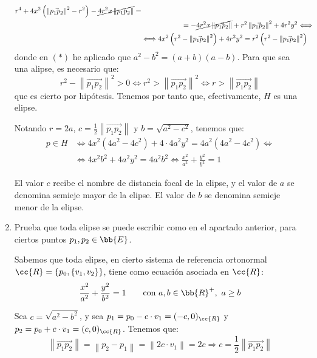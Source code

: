 \begin{ejercicio}
\begin{enumerate}
\begin{align*}
        r^4 + 4x^2\left(\left\|\vec{p_1p_2}\right\|^2-r^2\right) -\cancel{4r^2x\left\|\vec{p_1p_2}\right\|} =\\&\hspace{2cm}= - \cancel{4r^2x\left\|\vec{p_1p_2}\right\|} +r^2\left\|\vec{p_1p_2}\right\|^2 + 4r^2y^2 \Longleftrightarrow \\ & \Longleftrightarrow
        4x^2\left(r^2 - \left\|\vec{p_1p_2}\right\|^2\right) + 4r^2y^2 = r^2\left(r^2 - \left\|\vec{p_1p_2}\right\|^2\right)
    \end{align*}
    donde en $(\ast)$ he aplicado que $a^2-b^2=(a+b)(a-b)$. Para que sea una alipse, es necesario que:
    \begin{equation*}
        r^2 - \left\|\vec{p_1p_2}\right\|^2 > 0 \Longleftrightarrow
        r^2 > \left\|\vec{p_1p_2}\right\|^2 \Longleftrightarrow
        r > \left\|\vec{p_1p_2}\right\|
    \end{equation*}
    que es cierto por hipótesis. Tenemos por tanto que, efectivamente, $H$ es una elipse.
    
    Notando $r=2a$, $c=\frac{1}{2}\left\|\vec{p_1p_2}\right\|$ y $b=\sqrt{a^2-c^2}$, tenemos que:
    \begin{align*}
        p\in H &\Longleftrightarrow 4x^2\left(4a^2 - 4c^2\right) + 4\cdot 4a^2y^2 = 4a^2(4a^2 - 4c^2) \Longleftrightarrow \\ & \Longleftrightarrow
        4x^2b^2 + 4a^2y^2 = 4a^2b^2 \Longleftrightarrow
        \frac{x^2}{a^2} + \frac{y^2}{b^2} = 1
    \end{align*}

    El valor $c$ recibe el nombre de distancia focal de la elipse, y el valor de $a$ se denomina semieje mayor de la elipse.
    El valor de $b$ se denomina semieje menor de la elipse.

    \item Prueba que toda elipse se puede escribir como en el apartado anterior, para ciertos puntos $p_1, p_2 \in \bb{E}$.
    
    Sabemos que toda elipse, en cierto sistema de referencia ortonormal $\cc{R}=\{p_0, \{v_1, v_2\}\}$, tiene como ecuación asociada en $\cc{R}$:
    \begin{equation*}
        \frac{x^2}{a^2} + \frac{y^2}{b^2} = 1 \qquad \text{con } a,b\in \bb{R}^+,~a\geq b
    \end{equation*}

    Sea $c=\sqrt{a^2-b^2}$, y sea $p_1 = p_0 - c\cdot v_1=(-c,0)_{\cc{R}}$ y $p_2 = p_0  +c\cdot v_1=(c,0)_{\cc{R}}$. Tenemos que:
    \begin{equation*}
        \left\|\vec{p_1p_2}\right\| = \left\|p_2 - p_1\right\| = \left\|2c\cdot v_1\right\|= 2c \Longrightarrow c = \frac{1}{2}\left\|\vec{p_1p_2}\right\|
    \end{equation*}


\end{enumerate}
\end{ejercicio}
